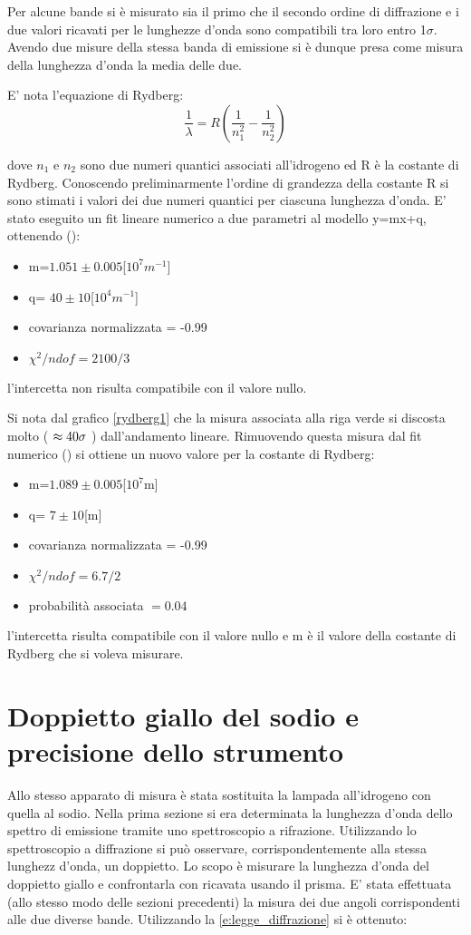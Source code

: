 Per alcune bande si è misurato sia il primo che il secondo ordine di diffrazione e i due valori ricavati per le lunghezze d'onda sono compatibili tra loro entro 1$\sigma$. Avendo due misure della stessa banda di emissione si è dunque presa come misura della lunghezza d'onda la media delle due.

E' nota l'equazione di Rydberg:
\begin{equation}
\frac{1}{\lambda} = R (\frac{1}{n_{1}^2} - \frac{1}{n_{2}^2})
\end{equation} 

dove $n_1$ e $n_2$  sono due numeri quantici associati all'idrogeno ed R è la costante di Rydberg. Conoscendo preliminarmente l'ordine di grandezza della costante R si sono stimati i valori dei due numeri quantici per ciascuna lunghezza d'onda. E' stato eseguito un fit lineare numerico a due parametri al modello y=mx+q, ottenendo (): 
\begin{itemize}
\item	m=$1.051\pm0.005$[$10^{7} m^{-1}$]
\item	q= $40 \pm 10$[$10^{4} m^{-1}$]
\item	covarianza normalizzata = -0.99
\item	$\chi^{2}/ndof= 2100/3$
\end{itemize}

l'intercetta non risulta compatibile con il valore nullo.

Si nota dal grafico \ref{rydberg1} che la misura associata alla riga verde si discosta molto ( $ \approx 40\space \sigma$ ) dall'andamento lineare. Rimuovendo questa misura dal fit numerico () si ottiene un nuovo valore per la costante di Rydberg:
\begin{itemize}
\item	m=$1.089\pm0.005$[$10^{7}$m]
\item	q= $7 \pm 10$[m]
\item	covarianza normalizzata = -0.99
\item	$\chi^{2}/ndof= 6.7/2$
\item	probabilità associata $= 0.04$
\end{itemize}
l'intercetta risulta compatibile con il valore nullo e m è il valore della costante di Rydberg che si voleva misurare.

\section{Doppietto giallo del sodio e precisione dello strumento}
Allo stesso apparato di misura è stata sostituita la lampada all'idrogeno con quella al sodio. Nella prima sezione si era determinata la lunghezza d'onda dello spettro di emissione tramite uno spettroscopio a rifrazione. Utilizzando lo spettroscopio a diffrazione si può osservare, corrispondentemente alla stessa lunghezz d'onda, un doppietto. Lo scopo è misurare la lunghezza d'onda del doppietto giallo e confrontarla con ricavata usando il prisma.
E' stata effettuata (allo stesso modo delle sezioni precedenti) la misura dei due angoli corrispondenti alle due diverse bande. Utilizzando la \ref{e:legge_diffrazione} si è ottenuto:

